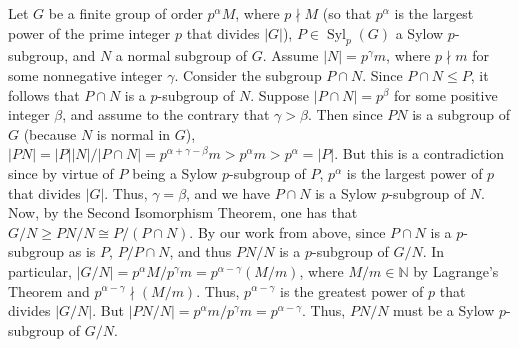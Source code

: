 \documentclass{article}
\begin{document}
	Let $G$ be a finite group of order $p^{\alpha}M$, where $p \nmid M$ (so that $p^{\alpha}$ is the largest power of the prime integer $p$ that divides $|G|$), $P \in \operatorname{Syl}_{p}(G)$ a Sylow $p$-subgroup, and $N$ a normal subgroup of $G$. Assume $|N| = p^{\gamma}m$, where $p \nmid m$ for some nonnegative integer $\gamma$. Consider the subgroup $P \cap N$. Since $P \cap N \leq P$, it follows that $P \cap N$ is a $p$-subgroup of $N$. Suppose $|P \cap N| = p^{\beta}$ for some positive integer $\beta$, and assume to the contrary that $\gamma > \beta$. Then since $PN$ is a subgroup of $G$ (because $N$ is normal in $G$), $|PN| = |P||N|/|P \cap N| = p^{\alpha + \gamma - \beta}m > p^{\alpha}m > p^{\alpha} = |P|$. But this is a contradiction since by virtue of $P$ being a Sylow $p$-subgroup of $P$, $p^{\alpha}$ is the largest power of $p$ that divides $|G|$. Thus, $\gamma = \beta$, and we have $P \cap N$ is a Sylow $p$-subgroup of $N$. Now, by the Second Isomorphism Theorem, one has that $G/N \geq PN/N \cong P/(P \cap N)$. By our work from above, since $P \cap N$ is a $p$-subgroup as is $P$, $P/P \cap N$, and thus $PN/N$ is a $p$-subgroup of $G/N$. In particular, $|G/N| = p^{\alpha}M/p^{\gamma}m = p^{\alpha -\gamma}(M/m)$, where $M/m \in \mathbb{N}$ by Lagrange's Theorem and $p^{\alpha - \gamma} \nmid (M/m)$. Thus, $p^{\alpha - \gamma}$ is the greatest power of $p$ that divides $|G/N|$. But $|PN/N| = p^{\alpha}m/p^{\gamma}m = p^{\alpha - \gamma}$. Thus, $PN/N$ must be a Sylow $p$-subgroup of $G/N$.
	
\end{document}
